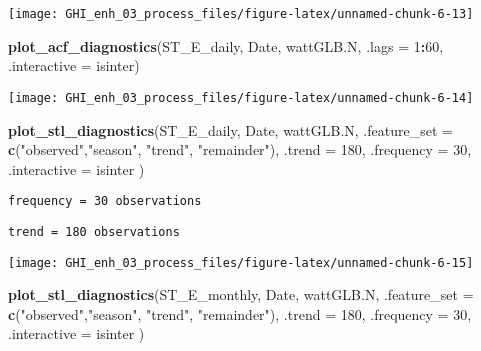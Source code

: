 \documentclass[
  10pt,
  a4paper,oneside]{article}
\newenvironment{Shaded}{\begin{snugshade}}{\end{snugshade}}
\newcommand{\AttributeTok}[1]{\textcolor[rgb]{0.13,0.29,0.53}{#1}}
\newcommand{\DecValTok}[1]{\textcolor[rgb]{0.00,0.00,0.81}{#1}}
\newcommand{\FunctionTok}[1]{\textcolor[rgb]{0.13,0.29,0.53}{\textbf{#1}}}
\newcommand{\NormalTok}[1]{#1}
\newcommand{\SpecialCharTok}[1]{\textcolor[rgb]{0.81,0.36,0.00}{\textbf{#1}}}
\newcommand{\StringTok}[1]{\textcolor[rgb]{0.31,0.60,0.02}{#1}}
\begin{document}
\begin{center}\texttt{[image: GHI\_enh\_03\_process\_files/figure-latex/unnamed-chunk-6-13]} \end{center}

\begin{Shaded}
\begin{Highlighting}[]
\FunctionTok{plot\_acf\_diagnostics}\NormalTok{(ST\_E\_daily, Date, wattGLB.N, }\AttributeTok{.lags =} \DecValTok{1}\SpecialCharTok{:}\DecValTok{60}\NormalTok{, }\AttributeTok{.interactive =}\NormalTok{ isinter)}
\end{Highlighting}
\end{Shaded}

\begin{center}\texttt{[image: GHI\_enh\_03\_process\_files/figure-latex/unnamed-chunk-6-14]} \end{center}

\begin{Shaded}
\begin{Highlighting}[]
\FunctionTok{plot\_stl\_diagnostics}\NormalTok{(ST\_E\_daily, Date, wattGLB.N,}
                     \AttributeTok{.feature\_set =} \FunctionTok{c}\NormalTok{(}\StringTok{"observed"}\NormalTok{,}\StringTok{"season"}\NormalTok{, }\StringTok{"trend"}\NormalTok{, }\StringTok{"remainder"}\NormalTok{),}
                     \AttributeTok{.trend =} \DecValTok{180}\NormalTok{,}
                     \AttributeTok{.frequency =} \DecValTok{30}\NormalTok{,}
                     \AttributeTok{.interactive =}\NormalTok{ isinter}
\NormalTok{                     )}
\end{Highlighting}
\end{Shaded}

\begin{verbatim}
frequency = 30 observations
\end{verbatim}

\begin{verbatim}
trend = 180 observations
\end{verbatim}

\begin{center}\texttt{[image: GHI\_enh\_03\_process\_files/figure-latex/unnamed-chunk-6-15]} \end{center}

\begin{Shaded}
\begin{Highlighting}[]
\FunctionTok{plot\_stl\_diagnostics}\NormalTok{(ST\_E\_monthly, Date, wattGLB.N,}
                     \AttributeTok{.feature\_set =} \FunctionTok{c}\NormalTok{(}\StringTok{"observed"}\NormalTok{,}\StringTok{"season"}\NormalTok{, }\StringTok{"trend"}\NormalTok{, }\StringTok{"remainder"}\NormalTok{),}
                     \AttributeTok{.trend =} \DecValTok{180}\NormalTok{,}
                     \AttributeTok{.frequency =} \DecValTok{30}\NormalTok{,}
                     \AttributeTok{.interactive =}\NormalTok{ isinter}
\NormalTok{                     )}
\end{Highlighting}
\end{Shaded}
\end{document}
